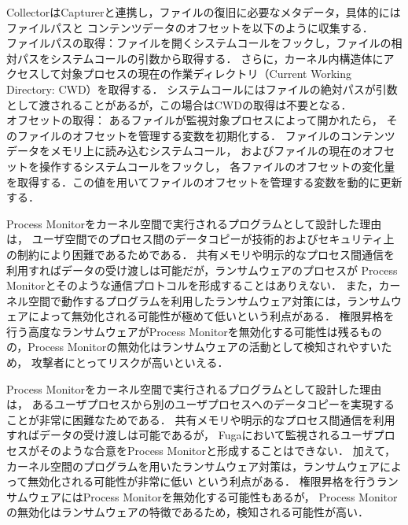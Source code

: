 CollectorはCapturerと連携し，ファイルの復旧に必要なメタデータ，具体的にはファイルパスと
コンテンツデータのオフセットを以下のように収集する．
\\
ファイルパスの取得：ファイルを開くシステムコールをフックし，ファイルの相対パスをシステムコールの引数から取得する．
さらに，カーネル内構造体にアクセスして対象プロセスの現在の作業ディレクトリ（Current Working Directory: CWD）を取得する．
システムコールにはファイルの絶対パスが引数として渡されることがあるが，この場合はCWDの取得は不要となる．
\\
オフセットの取得：
あるファイルが監視対象プロセスによって開かれたら，
そのファイルのオフセットを管理する変数を初期化する．
ファイルのコンテンツデータをメモリ上に読み込むシステムコール，
およびファイルの現在のオフセットを操作するシステムコールをフックし，
各ファイルのオフセットの変化量を取得する．この値を用いてファイルのオフセットを管理する変数を動的に更新する．

Process Monitorをカーネル空間で実行されるプログラムとして設計した理由は，
ユーザ空間でのプロセス間のデータコピーが技術的およびセキュリティ上の制約により困難であるためである．
共有メモリや明示的なプロセス間通信を利用すればデータの受け渡しは可能だが，ランサムウェアのプロセスが
Process Monitorとそのような通信プロトコルを形成することはありえない．
また，カーネル空間で動作するプログラムを利用したランサムウェア対策には，ランサムウェアによって無効化される可能性が極めて低いという利点がある\cite{mitigation-modern}．
権限昇格を行う高度なランサムウェアがProcess Monitorを無効化する可能性は残るものの，Process Monitorの無効化はランサムウェアの活動として検知されやすいため，
攻撃者にとってリスクが高いといえる．

Process Monitorをカーネル空間で実行されるプログラムとして設計した理由は，
あるユーザプロセスから別のユーザプロセスへのデータコピーを実現することが非常に困難なためである．
共有メモリや明示的なプロセス間通信を利用すればデータの受け渡しは可能であるが，
Fugaにおいて監視されるユーザプロセスがそのような合意をProcess Monitorと形成することはできない．
加えて，カーネル空間のプログラムを用いたランサムウェア対策は，ランサムウェアによって無効化される可能性が非常に低い \cite{mitigation-modern}という利点がある．
権限昇格を行うランサムウェアにはProcess Monitorを無効化する可能性もあるが，
Process Monitorの無効化はランサムウェアの特徴であるため，検知される可能性が高い．

